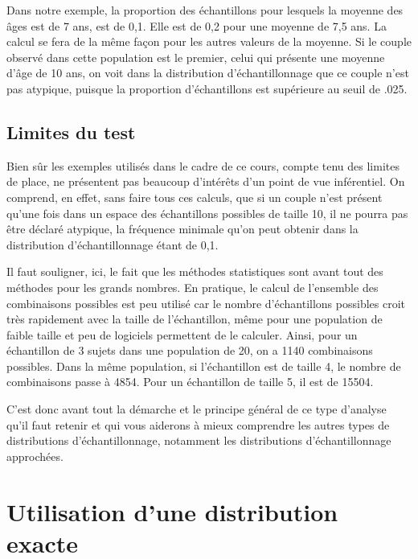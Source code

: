 \documentclass[]{book}
\theoremstyle{definition}
\theoremstyle{definition}
\theoremstyle{definition}
\theoremstyle{remark}
\begin{document}
Dans notre exemple, la proportion des échantillons pour lesquels la
moyenne des âges est de 7 ans, est de 0,1. Elle est de 0,2 pour une
moyenne de 7,5 ans. La calcul se fera de la même façon pour les autres
valeurs de la moyenne. Si le couple observé dans cette population est le
premier, celui qui présente une moyenne d'âge de 10 ans, on voit dans la
distribution d'échantillonnage que ce couple n'est pas atypique, puisque
la proportion d'échantillons est supérieure au seuil de .025.

\hypertarget{limites-du-test}{%
\subsection{Limites du test}\label{limites-du-test}}

Bien sûr les exemples utilisés dans le cadre de ce cours, compte tenu
des limites de place, ne présentent pas beaucoup d'intérêts d'un point
de vue inférentiel. On comprend, en effet, sans faire tous ces calculs,
que si un couple n'est présent qu'une fois dans un espace des
échantillons possibles de taille 10, il ne pourra pas être déclaré
atypique, la fréquence minimale qu'on peut obtenir dans la distribution
d'échantillonnage étant de 0,1.

Il faut souligner, ici, le fait que les méthodes statistiques sont avant
tout des méthodes pour les grands nombres. En pratique, le calcul de
l'ensemble des combinaisons possibles est peu utilisé car le nombre
d'échantillons possibles croit très rapidement avec la taille de
l'échantillon, même pour une population de faible taille et peu de
logiciels permettent de le calculer. Ainsi, pour un échantillon de 3
sujets dans une population de 20, on a 1140 combinaisons possibles. Dans
la même population, si l'échantillon est de taille 4, le nombre de
combinaisons passe à 4854. Pour un échantillon de taille 5, il est de
15504.

C'est donc avant tout la démarche et le principe général de ce type
d'analyse qu'il faut retenir et qui vous aiderons à mieux comprendre les
autres types de distributions d'échantillonnage, notamment les
distributions d'échantillonnage approchées.

\hypertarget{utilisation-dune-distribution-exacte}{%
\section{Utilisation d'une distribution
exacte}\label{utilisation-dune-distribution-exacte}}
\end{document}
